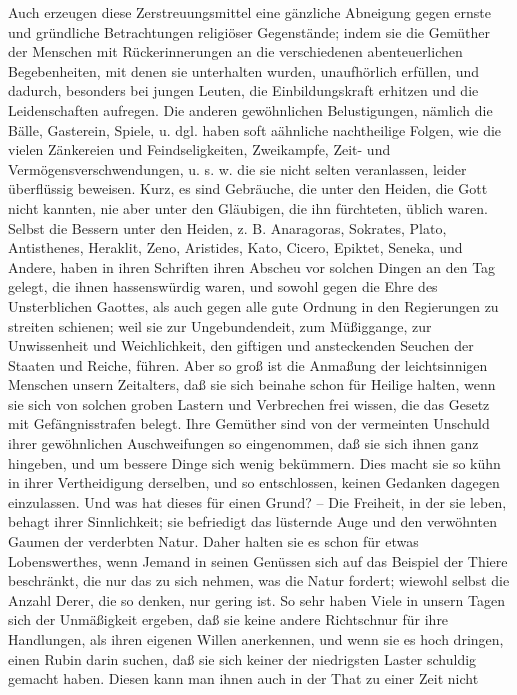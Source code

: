 Auch erzeugen diese Zerstreuungsmittel eine gänzliche Abneigung gegen ernste und
gründliche Betrachtungen religiöser Gegenstände; indem sie die Gemüther der
Menschen mit Rückerinnerungen an die verschiedenen abenteuerlichen
Begebenheiten, mit denen sie unterhalten wurden, unaufhörlich erfüllen, und
dadurch, besonders bei jungen Leuten, die Einbildungskraft erhitzen und die
Leidenschaften aufregen. Die anderen gewöhnlichen Belustigungen, nämlich die
Bälle, Gasterein, Spiele, u. dgl. haben soft aähnliche nachtheilige Folgen, wie
die vielen Zänkereien und Feindseligkeiten, Zweikampfe, Zeit- und
Vermögensverschwendungen, u. s. w. die sie nicht selten veranlassen, leider
überflüssig beweisen. Kurz, es sind Gebräuche, die unter den Heiden, die Gott
nicht kannten, nie aber unter den Gläubigen, die ihn fürchteten, üblich waren.
Selbst die Bessern unter den Heiden, z. B. Anaragoras, Sokrates, Plato,
Antisthenes, Heraklit, Zeno, Aristides, Kato, Cicero, Epiktet, Seneka, und
Andere, haben in ihren Schriften ihren Abscheu vor solchen Dingen an den Tag
gelegt, die ihnen hassenswürdig waren, und sowohl gegen die Ehre des
Unsterblichen Gaottes, als auch gegen alle gute Ordnung in den Regierungen zu
streiten schienen; weil sie zur Ungebundendeit, zum Müßiggange, zur Unwissenheit
und Weichlichkeit, den giftigen und ansteckenden Seuchen der Staaten und Reiche,
führen. Aber so groß ist die Anmaßung der leichtsinnigen Menschen unsern
Zeitalters, daß sie sich beinahe schon für Heilige halten, wenn sie sich von
solchen groben Lastern und Verbrechen frei wissen, die das Gesetz mit
Gefängnisstrafen belegt. Ihre Gemüther sind von der vermeinten Unschuld ihrer
gewöhnlichen Auschweifungen so eingenommen, daß sie sich ihnen ganz hingeben,
und um bessere Dinge sich wenig bekümmern. Dies macht sie so kühn in ihrer
Vertheidigung derselben, und so entschlossen, keinen Gedanken dagegen
einzulassen. Und was hat dieses für einen Grund? -- Die Freiheit, in der sie
leben, behagt ihrer Sinnlichkeit; sie befriedigt das lüsternde Auge und den
verwöhnten Gaumen der verderbten Natur. Daher halten sie es schon für etwas
Lobenswerthes, wenn Jemand in seinen Genüssen sich auf das Beispiel der Thiere
beschränkt, die nur das zu sich nehmen, was die Natur fordert; wiewohl selbst
die Anzahl Derer, die so denken, nur gering ist. So sehr haben Viele in unsern
Tagen sich der Unmäßigkeit ergeben, daß sie keine andere Richtschnur für ihre
Handlungen, als ihren eigenen Willen anerkennen, und wenn sie es hoch dringen,
einen Rubin darin suchen, daß sie sich keiner der niedrigsten Laster schuldig
gemacht haben. Diesen kann man ihnen auch in der That zu einer Zeit nicht
